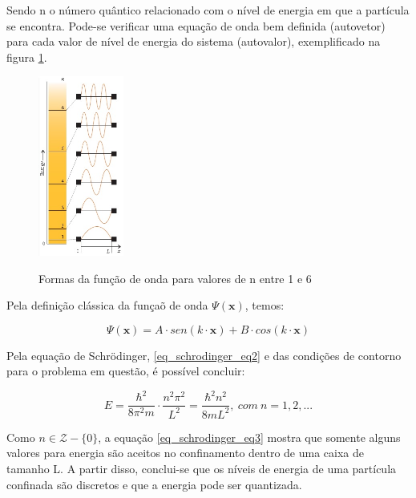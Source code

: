     \par Sendo n o número quântico relacionado com o nível de energia em que a partícula se encontra. Pode-se verificar uma equação de onda bem definida (autovetor) para cada valor de nível de energia do sistema (autovalor), exemplificado na figura \ref{fig1}\cite{frustrado2}.

    \begin{figure}[h!]
      \caption{Formas da função de onda para valores de n entre 1 e 6}
      \centering
      \includegraphics[width=0.25\textwidth]{images/figura1.png}
      \label{fig1}
    \end{figure}

    \par Pela definição clássica da funçaõ de onda $\Psi(\mathbf{x})$, temos:

    \begin{equation}\label{eq_schrodinger_eq2}
        \Psi (\mathbf{x}) = A \cdot sen(k \cdot \mathbf{x}) + B \cdot cos(k \cdot \mathbf{x})
    \end{equation}

    \par Pela equação de Schrödinger, \eqref{eq_schrodinger_eq2} e das condições de contorno para o problema em questão, é possível concluir:

    \begin{equation}\label{eq_schrodinger_eq3}
      E = \frac{\hbar^2}{8 \pi^2 m} \cdot \frac{n^2\pi^2}{L^2} = \frac{\hbar^2 n^2}{8 m L^2},\ com\ n = 1, 2, ...
    \end{equation}

    \par Como $n \in \mathcal{Z} - \{0\}$, a equação \eqref{eq_schrodinger_eq3} mostra que somente alguns valores para energia são aceitos no confinamento dentro de uma caixa de tamanho L. A partir disso, conclui-se que os níveis de energia de uma partícula confinada são discretos e que a energia pode ser quantizada\cite{frustrado2}.

